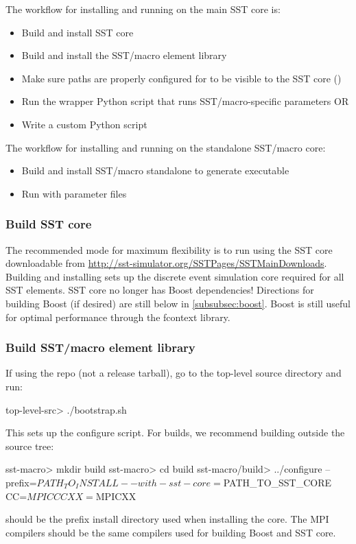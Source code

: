 The workflow for installing and running on the main SST core is:
\begin{itemize}
\item	Build and install SST core
\item Build and install the SST/macro element library  
\item Make sure paths are properly configured for  to be visible to the SST core ()
\item Run the  wrapper Python script that runs SST/macro-specific parameters OR
\item Write a custom Python script 
\end{itemize}

The workflow for installing and running on the standalone SST/macro core:
\begin{itemize}
\item Build and install SST/macro standalone to generate  executable
\item Run  with  parameter files
\end{itemize}

\subsubsection{Build SST core}\label{subsec:buildSSTCore}
The recommended mode for maximum flexibility is to run using the SST core downloadable from \url{http://sst-simulator.org/SSTPages/SSTMainDownloads}.
Building and installing sets up the discrete event simulation core required for all SST elements.
SST core no longer has Boost dependencies! Directions for building Boost (if desired) are still below in \ref{subsubsec:boost}.
Boost is still useful for optimal performance through the fcontext library. 

\subsubsection{Build SST/macro element library}\label{subsec:buildElementLib}
If using the repo (not a release tarball), go to the top-level source directory and run:
\begin{ShellCmd}
top-level-src> ./bootstrap.sh
\end{ShellCmd}
This sets up the configure script. For builds, we recommend building outside the source tree:

\begin{ShellCmd}
sst-macro> mkdir build
sst-macro> cd build
sst-macro/build> ../configure --prefix=$PATH_TO_INSTALL --with-sst-core=$PATH_TO_SST_CORE CC=$MPICC CXX=$MPICXX
\end{ShellCmd}
 should be the prefix install directory used when installing the core.  
The MPI compilers should be the same compilers used for building Boost and SST core.


